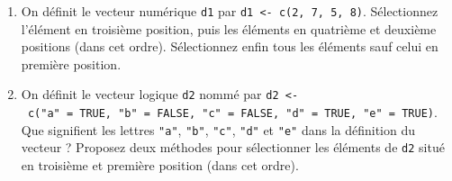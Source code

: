 \documentclass[12pt,twosided, notitlepage]{book}
\newenvironment{Shaded}{}{}
\newcommand{\KeywordTok}[1]{\textcolor[rgb]{0.00,0.00,1.00}{{#1}}}
\newcommand{\DecValTok}[1]{{#1}}
\newcommand{\StringTok}[1]{\textcolor[rgb]{0.00,0.50,0.50}{{#1}}}
\newcommand{\CommentTok}[1]{\textcolor[rgb]{0.00,0.50,0.00}{{#1}}}
\newcommand{\NormalTok}[1]{{#1}}
\newif \ifsol
\renewenvironment{Shaded}{\begin{snugshade}}{\end{snugshade}}
\begin{document}
\begin{enumerate}
\def\labelenumi{\alph{enumi}.}
\item
  On définit le vecteur numérique \texttt{d1} par
  \texttt{d1\ \textless{}-\ c(2,\ 7,\ 5,\ 8)}. Sélectionnez l'élément en
  troisième position, puis les éléments en quatrième et deuxième
  positions (dans cet ordre). Sélectionnez enfin tous les éléments sauf
  celui en première position.\index{\texttt{[}}

  \ifsol 

  \begin{center} \rule{0.5\linewidth}{\linethickness}\end{center}

\begin{Shaded}
\begin{Highlighting}[]
\NormalTok{d1 <-}\StringTok{ }\KeywordTok{c}\NormalTok{(}\DecValTok{2}\NormalTok{, }\DecValTok{7}\NormalTok{, }\DecValTok{5}\NormalTok{, }\DecValTok{8}\NormalTok{)}
\NormalTok{d1}
  \NormalTok{## [1] 2 7 5 8}

\CommentTok{# Sélection de l'élément en troisième position}
\NormalTok{d1[}\DecValTok{3}\NormalTok{]}
  \NormalTok{## [1] 5}

\CommentTok{# Sélection des éléments en quatrième et en deuxième}
\CommentTok{# position (dans cet ordre)}
\NormalTok{d1[}\KeywordTok{c}\NormalTok{(}\DecValTok{4}\NormalTok{, }\DecValTok{2}\NormalTok{)]}
  \NormalTok{## [1] 8 7}

\CommentTok{# Sélection de tous les éléments sauf celui en}
\CommentTok{# première position}
\NormalTok{d1[-}\DecValTok{1}\NormalTok{]}
  \NormalTok{## [1] 7 5 8}
\end{Highlighting}
\end{Shaded}

  \begin{center} \rule{0.5\linewidth}{\linethickness}\end{center}

  \bigskip  \fi 
\item
  On définit le vecteur logique \texttt{d2} nommé par
  \texttt{d2\ \textless{}-\ c("a"\ =\ TRUE,\ "b"\ =\ FALSE,\ "c"\ =\ FALSE,\ "d"\ =\ TRUE,\ "e"\ =\ TRUE)}.
  Que signifient les lettres \texttt{"a"}, \texttt{"b"}, \texttt{"c"},
  \texttt{"d"} et \texttt{"e"} dans la définition du vecteur ? Proposez
  deux méthodes pour sélectionner les éléments de \texttt{d2} situé en
  troisième et première position (dans cet ordre).\index{\texttt{[}}

  \ifsol 


\end{enumerate}
\end{document}
